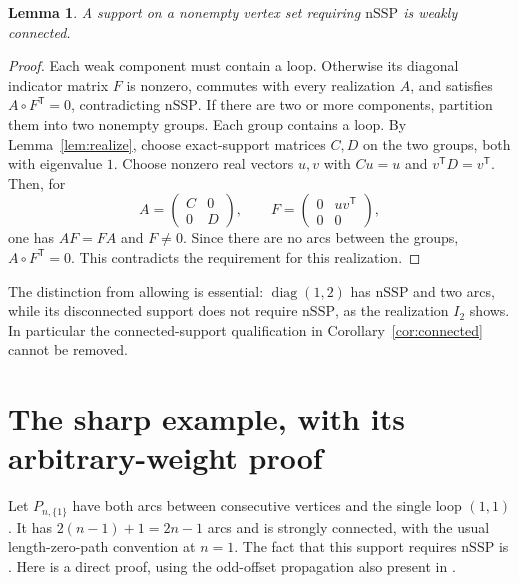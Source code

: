 \documentclass[11pt]{article}
\newtheorem{lemma}[theorem]{Lemma}
\newcommand{\nssp}{\mathrm{nSSP}}
\begin{document}
\begin{lemma}\label{lem:connected}
A support on a nonempty vertex set requiring $\nssp$ is weakly connected.
\end{lemma}
\begin{proof}
Each weak component must contain a loop. Otherwise its diagonal
indicator matrix $F$ is nonzero, commutes with every realization $A$,
and satisfies $A\circ F^{\mathsf T}=0$, contradicting $\nssp$.
If there are two or more components, partition them into two nonempty
groups. Each group contains a loop. By Lemma~\ref{lem:realize}, choose
exact-support matrices $C,D$ on the two groups, both with eigenvalue
$1$. Choose nonzero real vectors $u,v$ with $Cu=u$ and
$v^{\mathsf T}D=v^{\mathsf T}$. Then, for
\[
 A=\begin{pmatrix}C&0\\0&D\end{pmatrix},\qquad
 F=\begin{pmatrix}0&uv^{\mathsf T}\\0&0\end{pmatrix},
\]
one has $AF=FA$ and $F\ne0$. Since there are no arcs between the
groups, $A\circ F^{\mathsf T}=0$. This contradicts the requirement
for this realization.
\end{proof}

The distinction from allowing is essential: $\operatorname{diag}(1,2)$
has $\nssp$ and two arcs, while its disconnected support does not
require $\nssp$, as the realization $I_2$ shows. In particular the
connected-support qualification in Corollary~\ref{cor:connected}
cannot be removed.

\section{The sharp example, with its arbitrary-weight proof}
Let $P_{n,\{1\}}$ have both arcs between consecutive vertices and the
single loop $(1,1)$. It has $2(n-1)+1=2n-1$ arcs and is strongly
connected, with the usual length-zero-path convention at $n=1$.
The fact that this support requires $\nssp$ is
\cite[Theorem 5.5 with $m=1$, p.~771; Remark 2.10(A), p.~764]{KO}.
Here is a direct proof, using the odd-offset propagation also present
in \cite{Formal}.
\end{document}
